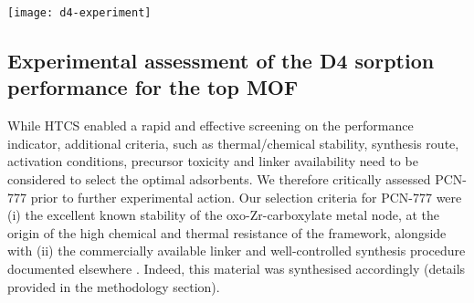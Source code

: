 \begin{widefigure}[htb]
    \centering
    \texttt{[image: d4-experiment]}
    \caption{%
        (a) Single component adsorption/desorption isotherms for D4 (blue) and
         (red) collected at \SI{303}{\kelvin} for PCN-777 in the
        pressure range of 0-\SI{10}{\pascal} (corresponding to 0--0.05
        p/p\textsuperscript{0} for D4). Solid and open symbols represent
        adsorption and desorption branches, respectively. (b) Comparison of the
        D4 capacity of MOFs investigated in the present study with other classes
        of porous materials (data from
        \citet{wangRecentAdvancesTechnologies2019}), with error bars placed at
        one standard deviation of mean capacity. (c) 5 D4 sorption-desorption
        cycles recorded after the first two isotherms on PCN-777, in the same
        pressure range. (d) PXRD of pristine PCN-777 (black) and samples
        recovered after D4 cycling (blue) and water adsorption (red).
    }\label{fig:d4-experiment}
\end{widefigure}

\subsection{Experimental assessment of the D4 sorption performance for the top MOF}\label{assessment}

While HTCS enabled a rapid and effective screening on the performance indicator,
additional criteria, such as thermal/chemical stability, synthesis route,
activation conditions, precursor toxicity and linker availability need to be
considered to select the optimal adsorbents. We therefore critically assessed
PCN-777 prior to further experimental action. Our selection criteria for PCN-777
were (i) the excellent known stability of the oxo-Zr-carboxylate metal node, at
the origin of the high chemical and thermal resistance of the framework,
alongside with (ii) the commercially available linker and well-controlled
synthesis procedure documented elsewhere \citep{fengHighlyStableZeotype2015,
liuPhotocatalyticHydrogenProduction2018}. Indeed, this material was synthesised
accordingly (details provided in the methodology section).

